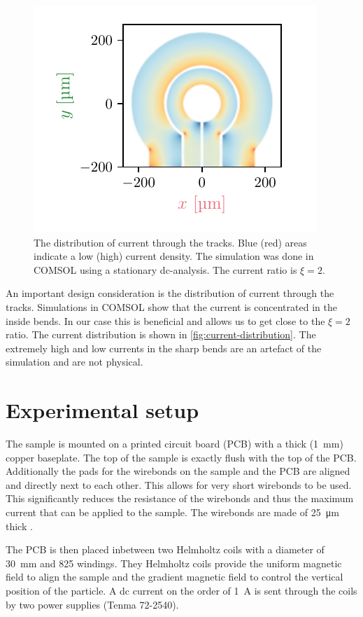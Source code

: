 \begin{figure}
    \centering
    \includegraphics{figures/data/current_through_tracks.pdf}
    \caption{The distribution of current through the tracks. Blue (red) areas indicate a low (high) current density. The simulation was done in COMSOL using a stationary dc-analysis. The current ratio is $\xi = 2$.}
    \label{fig:current-distribution}
\end{figure}

An important design consideration is the distribution of current through the tracks. Simulations in COMSOL show that the current is concentrated in the inside bends. In our case this is beneficial and allows us to get close to the $\xi = 2$ ratio. The current distribution is shown in \autoref{fig:current-distribution}. The extremely high and low currents in the sharp bends are an artefact of the simulation and are not physical.

\section{Experimental setup}
The sample is mounted on a printed circuit board (PCB) with a thick (\qty{1}{\mm}) copper baseplate. The top of the sample is exactly flush with the top of the PCB. Additionally the pads for the wirebonds on the sample and the PCB are aligned and directly next to each other. This allows for very short wirebonds to be used. This significantly reduces the resistance of the wirebonds and thus the maximum current that can be applied to the sample. The wirebonds are made of \qty{25}{\um} thick .

The PCB is then placed inbetween two Helmholtz coils with a diameter of \qty{30}{\mm} and 825 windings. They Helmholtz coils provide the uniform magnetic field to align the sample and the gradient magnetic field to control the vertical position of the particle. A dc current on the order of \qty{1}{\ampere} is sent through the coils by two power supplies (Tenma 72-2540).

